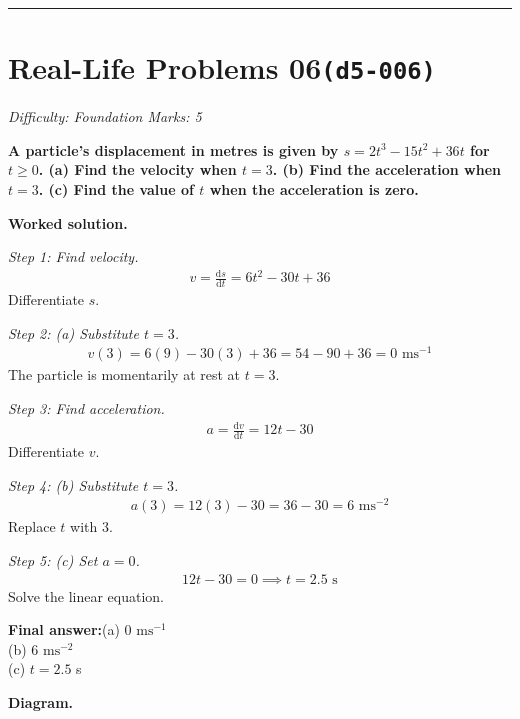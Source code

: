 \documentclass[11pt]{article}
\newcommand{\question}[1]{\par\medskip\noindent\textbf{#1}\par}
\begin{document}
\medskip\hrule

\section*{Real-Life Problems 06\quad\small\texttt{(d5-006)}}
\textit{Difficulty: Foundation \quad\textbar\quad Marks: 5}

\question{A particle's displacement in metres is given by \( s = 2t^3 - 15t^2 + 36t \) for \( t \geq 0 \). (a) Find the velocity when \( t = 3 \). (b) Find the acceleration when \( t = 3 \). (c) Find the value of \( t \) when the acceleration is zero.}

\textbf{Worked solution.}

\textit{Step 1: Find velocity.}
\[\begin{gathered}
v = \frac{\mathrm{d}s}{\mathrm{d}t} = 6t^2 - 30t + 36
\end{gathered}\]
Differentiate \( s \).

\textit{Step 2: (a) Substitute \( t = 3 \).}
\[\begin{gathered}
v(3) = 6(9) - 30(3) + 36 = 54 - 90 + 36 = 0 \text{ ms}^{-1}
\end{gathered}\]
The particle is momentarily at rest at \( t = 3 \).

\textit{Step 3: Find acceleration.}
\[\begin{gathered}
a = \frac{\mathrm{d}v}{\mathrm{d}t} = 12t - 30
\end{gathered}\]
Differentiate \( v \).

\textit{Step 4: (b) Substitute \( t = 3 \).}
\[\begin{gathered}
a(3) = 12(3) - 30 = 36 - 30 = 6 \text{ ms}^{-2}
\end{gathered}\]
Replace \( t \) with 3.

\textit{Step 5: (c) Set \( a = 0 \).}
\[\begin{gathered}
12t - 30 = 0 \implies t = 2.5 \text{ s}
\end{gathered}\]
Solve the linear equation.

\begin{answerbox}
\textbf{Final answer:}\quad (a) \(\displaystyle  0 \text{ ms}^{-1} \) \\[3pt]  (b) \(\displaystyle  6 \text{ ms}^{-2} \) \\[3pt]  (c) \(\displaystyle  t = 2.5 \) s
\end{answerbox}
\textbf{Diagram.}
\end{document}
